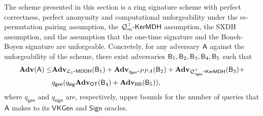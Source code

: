 \begin{theorem}
The scheme presented in this section is a ring signature scheme
with perfect correctness, perfect anonymity and computational unforgeability under the
$m$-permutation pairing assumption, the $\mathcal{Q}_m^\top\mbox{-}\mathsf{KerMDH}$ assumption, the SXDH assumption, and the assumption
that the one-time signature and the Boneh-Boyen signature are unforgeable.
Concretely, for any adversary $\mathsf{A}$ against the unforgeability of the scheme, there exist adversaries $\mathsf{B}_1,\mathsf{B}_2,\mathsf{B}_3,\mathsf{B}_4,\mathsf{B}_5$ such that
\begin{align*}
\mathbf{Adv}(\mathsf{A})\leq &\mathbf{Adv}_{\mathcal{L}_1\mbox{-}\mathsf{MDDH}}(\mathsf{B}_1)+\mathbf{Adv}_{q_\mathsf{gen}\mbox{-}PPA}(\mathsf{B}_2)+\mathbf{Adv}_{\mathcal{Q}^\top_{q_\mathsf{gen}}\mbox{-}\mathsf{KerMDH}}(\mathsf{B}_3)+\\
&q_\mathsf{gen}(q_\mathsf{sig}\mathbf{Adv}_{\mathsf{OT}}(\mathsf{B}_4)+\mathbf{Adv}_{\mathsf{BB}}(\mathsf{B}_5)),
\end{align*}
where $q_\mathsf{gen}$ and $q_\mathsf{sign}$ are, respectively, upper bounds for the number of queries that $\mathsf{A}$ makes to its $\mathsf{VKGen}$ and $\mathsf{Sign}$ oracles.
\end{theorem}
%
%
